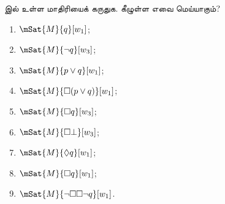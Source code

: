 \documentclass[../../../include/open-logic-section]{subfiles}
\begin{document}
\begin{prob}
   இல் உள்ள மாதிரியைக் கருதுக. கீழுள்ள
  எவை மெய்யாகும்?
    \begin{enumerate}
    \item $\mSat{M}{q}[w_1]$;
    \item $\mSat{M}{\lnot q}[w_3]$;
    \item $\mSat{M}{p \lor q}[w_1]$;
    \item $\mSat{M}{\Box (p \lor q)}[w_1]$;
    \item $\mSat{M}{\Box q}[w_3]$;
    \item $\mSat{M}{\Box \bot}[w_3]$;
    \item $\mSat{M}{\Diamond q}[w_1]$;
    \item $\mSat{M}{\Box q}[w_1]$;
    \item $\mSat{M}{\lnot \Box\Box \lnot q}[w_1]$.
    \end{enumerate}
\end{prob}
\end{document}
